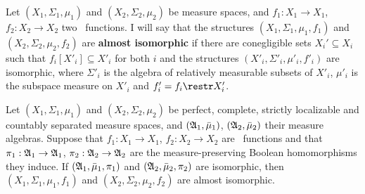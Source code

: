 Let $(X_1,\Sigma_1,\mu_1)$ and
$(X_2,\Sigma_2,\mu_2)$ be measure spaces, and $f_1:X_1\to X_1$,
$f_2:X_2\to X_2$ two \imp\ functions.   I will say that the structures
$(X_1,\Sigma_1,\mu_1,f_1)$ and $(X_2,\Sigma_2,\mu_2,f_2)$ are {\bf
almost isomorphic} if there are conegligible sets $X_i'\subseteq X_i$
such that $f_i[X'_i]\subseteq X'_i$ for both $i$ and the structures
$(X'_i,\Sigma'_i,\mu'_i,f'_i)$ are isomorphic, where $\Sigma'_i$ is the algebra of relatively measurable
subsets of $X'_i$, $\mu'_i$ is the subspace measure on $X'_i$ and
$f'_i=f_i\restr X'_i$.
     
 Let $(X_1,\Sigma_1,\mu_1)$ and
$(X_2,\Sigma_2,\mu_2)$ be perfect, complete, strictly localizable and
countably separated measure spaces, and $(\frak A_1,\bar\mu_1)$,
$(\frak A_2,\bar\mu_2)$ their measure algebras.   Suppose that
$f_1:X_1\to X_1$, $f_2:X_2\to X_2$ are \imp\ functions and that
$\pi_1:\frak A_1\to\frak A_1$, $\pi_2:\frak A_2\to\frak A_2$ are the
measure-preserving Boolean
homomorphisms they induce.   If $(\frak A_1,\bar\mu_1,\pi_1)$ and
$(\frak A_2,\bar\mu_2,\pi_2)$ are isomorphic, then
$(X_1,\Sigma_1,\mu_1,f_1)$ and $(X_2,\Sigma_2,\mu_2,f_2)$ are almost
isomorphic.
     
